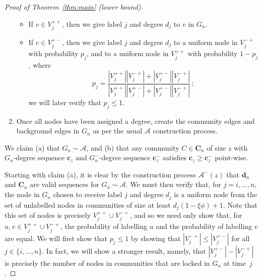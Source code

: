 \documentclass[12pt]{article}
\theoremstyle{definition}
\theoremstyle{remark}
\theoremstyle{remark}
\numberwithin{theorem}{section}
\newcommand{\abcdDist}{\ensuremath{\mathcal{A}}}
\newcommand{\abcdLower}{\ensuremath{\mathcal{A}^-(z)}}
\begin{document}
\begin{proof}[Proof of Theorem~\ref{thm:main} (lower bound)]
\begin{enumerate}
\begin{itemize}
\item If $v \in V_j^{++}$, then we give label $j$ and degree $d_j$ to $v$ in $G_n$.
\item If $v \in  V_j^{+-}$, then we give label $j$ and degree $d_j$ to a uniform node in $V_j^{-+}$ with probability $p_j$, and to a uniform node in $V_j^{++}$ with probability $1-p_j$, where
\[
p_j = \frac{|V_j^{++}||V_j^{-+}| + |V_j^{+-}||V_j^{-+}|}{|V_j^{++}||V_j^{+-}| + |V_j^{+-}||V_j^{-+}|} \,;
\]
we will later verify that $p_j \leq 1$. 
\end{itemize}
\item Once all nodes have been assigned a degree, create the community edges and background edges in $G_n$ as per the usual $\abcdDist$ construction process.
\end{enumerate}
We claim (a) that $G_n \sim \abcdDist$, and (b) that any community $C \in \textbf{C}_n$ of size $z$ with $G_n$-degree sequence $\mathbf{c}_z$ and $G_n^-$-degree sequence $\mathbf{c}_z^-$ satisfies $\mathbf{c}_z \geq \mathbf{c}_z^-$ point-wise.  

Starting with claim (a), it is clear by the construction process $\abcdLower$ that $\textbf{d}_n$ and $\textbf{C}_n$ are valid sequences for $G_n \sim \abcdDist$. We must then verify that, for $j  = i,\dots,n$, the node in $G_n$ chosen to receive label $j$ and degree $d_j$ is a uniform node from the set of unlabelled nodes in communities of size at least $d_j(1-\xi \phi) + 1$. Note that this set of nodes is precisely $V_j^{++} \cup V_j^{-+}$, and so we need only show that, for $u,v \in V_j^{++} \cup V_j^{-+}$, the probability of labelling $u$ and the probability of labelling $v$ are equal. We will first show that $p_j \leq 1$ by showing that $|V_j^{-+}| \leq |V_j^{+-}|$ for all $j \in \{i,\dots,n\}$. In fact, we will show a stronger result, namely, that $|V_j^{+-}|-|V_j^{-+}|$ is precisely the number of nodes in communities that are locked in $G_n$ at time~$j$.


\end{proof}
\end{document}
